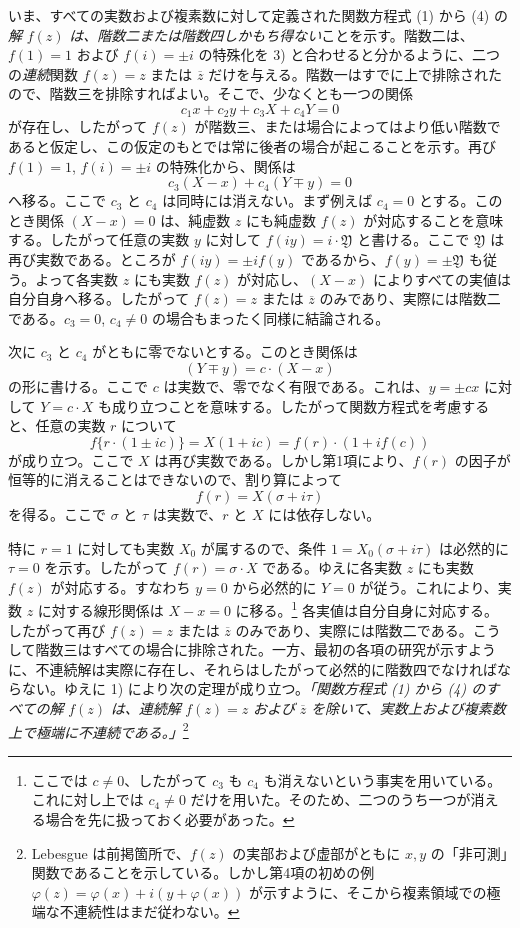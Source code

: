 \documentclass[11pt]{article}
\begin{document}
いま、すべての実数および複素数に対して定義された関数方程式 (1) から (4) の\emph{解} $f(z)$ \emph{は、階数二または階数四しかもち得ない}ことを示す。階数二は、$f(1)=1$ および $f(i)=\pm i$ の特殊化を 3) と合わせると分かるように、二つの\emph{連続}関数 $f(z)=z$ または $\overline z$ だけを与える。階数一はすでに上で排除されたので、階数三を排除すればよい。そこで、少なくとも一つの関係
\[
c_1x+c_2y+c_3X+c_4Y=0
\]
が存在し、したがって $f(z)$ が階数三、または場合によってはより低い階数であると仮定し、この仮定のもとでは常に後者の場合が起こることを示す。再び $f(1)=1$, $f(i)=\pm i$ の特殊化から、関係は
\[
c_3(X-x)+c_4(Y\mp y)=0
\]
へ移る。ここで $c_3$ と $c_4$ は同時には消えない。まず例えば $c_4=0$ とする。このとき関係 $(X-x)=0$ は、純虚数 $z$ にも純虚数 $f(z)$ が対応することを意味する。したがって任意の実数 $y$ に対して $f(iy)=i\cdot\mathfrak Y$ と書ける。ここで $\mathfrak Y$ は再び実数である。ところが $f(iy)=\pm i f(y)$ であるから、$f(y)=\pm\mathfrak Y$ も従う。よって各実数 $z$ にも実数 $f(z)$ が対応し、$(X-x)$ によりすべての実値は自分自身へ移る。したがって $f(z)=z$ または $\overline z$ のみであり、実際には階数二である。$c_3=0$, $c_4\ne0$ の場合もまったく同様に結論される。

次に $c_3$ と $c_4$ がともに零でないとする。このとき関係は
\[
(Y\mp y)=c\cdot(X-x)
\]
の形に書ける。ここで $c$ は実数で、零でなく有限である。これは、$y=\pm cx$ に対して $Y=c\cdot X$ も成り立つことを意味する。したがって関数方程式を考慮すると、任意の実数 $r$ について
\[
f\{r\cdot(1\pm ic)\}=X(1+ic)=f(r)\cdot(1+i f(c))
\]
が成り立つ。ここで $X$ は再び実数である。しかし第1項により、$f(r)$ の因子が恒等的に消えることはできないので、割り算によって
\[
f(r)=X(\sigma+i\tau)
\]
を得る。ここで $\sigma$ と $\tau$ は実数で、$r$ と $X$ には依存しない。

特に $r=1$ に対しても実数 $X_0$ が属するので、条件 $1=X_0(\sigma+i\tau)$ は必然的に $\tau=0$ を示す。したがって $f(r)=\sigma\cdot X$ である。ゆえに各実数 $z$ にも実数 $f(z)$ が対応する。すなわち $y=0$ から必然的に $Y=0$ が従う。これにより、実数 $z$ に対する線形関係は $X-x=0$ に移る。\footnote{ここでは $c\ne0$、したがって $c_3$ も $c_4$ も消えないという事実を用いている。これに対し上では $c_4\ne0$ だけを用いた。そのため、二つのうち一つが消える場合を先に扱っておく必要があった。} 各実値は自分自身に対応する。したがって再び $f(z)=z$ または $\overline z$ のみであり、実際には階数二である。こうして階数三はすべての場合に排除された。一方、最初の各項の研究が示すように、不連続解は実際に存在し、それらはしたがって必然的に階数四でなければならない。ゆえに 1) により次の定理が成り立つ。\emph{「関数方程式 (1) から (4) のすべての解} $f(z)$ \emph{は、連続解} $f(z)=z$ \emph{および} $\overline z$ \emph{を除いて、実数上および複素数上で極端に不連続である。」}\footnote{Lebesgue は前掲箇所で、$f(z)$ の実部および虚部がともに $x,y$ の「非可測」関数であることを示している。しかし第4項の初めの例 $\varphi(z)=\varphi(x)+i(y+\varphi(x))$ が示すように、そこから複素領域での極端な不連続性はまだ従わない。}
\end{document}
